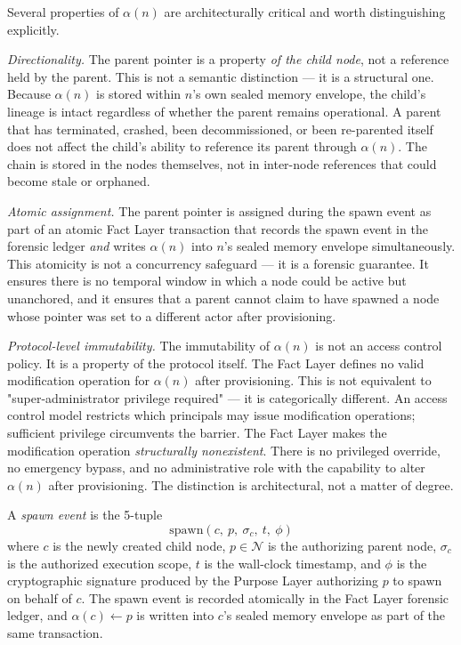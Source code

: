 Several properties of $\alpha(n)$ are architecturally critical and worth distinguishing explicitly.

\textit{Directionality.} The parent pointer is a property \emph{of the child node}, not a reference held by the parent. This is not a semantic distinction — it is a structural one. Because $\alpha(n)$ is stored within $n$'s own sealed memory envelope, the child's lineage is intact regardless of whether the parent remains operational. A parent that has terminated, crashed, been decommissioned, or been re-parented itself does not affect the child's ability to reference its parent through $\alpha(n)$. The chain is stored in the nodes themselves, not in inter-node references that could become stale or orphaned.

\textit{Atomic assignment.} The parent pointer is assigned during the spawn event as part of an atomic Fact Layer transaction that records the spawn event in the forensic ledger \emph{and} writes $\alpha(n)$ into $n$'s sealed memory envelope simultaneously. This atomicity is not a concurrency safeguard — it is a forensic guarantee. It ensures there is no temporal window in which a node could be active but unanchored, and it ensures that a parent cannot claim to have spawned a node whose pointer was set to a different actor after provisioning.

\textit{Protocol-level immutability.} The immutability of $\alpha(n)$ is not an access control policy. It is a property of the protocol itself. The Fact Layer defines no valid modification operation for $\alpha(n)$ after provisioning. This is not equivalent to "super-administrator privilege required" — it is categorically different. An access control model restricts which principals may issue modification operations; sufficient privilege circumvents the barrier. The Fact Layer makes the modification operation \emph{structurally nonexistent}. There is no privileged override, no emergency bypass, and no administrative role with the capability to alter $\alpha(n)$ after provisioning. The distinction is architectural, not a matter of degree.

\begin{dfn}
\label{dfn:spawn-event}
A \emph{spawn event} is the 5-tuple
\begin{equation}
\mathrm{spawn}(c,\ p,\ \sigma_c,\ t,\ \phi)
\label{eq:spawn-event}
\end{equation}
where $c$ is the newly created child node, $p \in \mathcal{N}$ is the authorizing parent node, $\sigma_c$ is the authorized execution scope, $t$ is the wall-clock timestamp, and $\phi$ is the cryptographic signature produced by the Purpose Layer authorizing $p$ to spawn on behalf of $c$. The spawn event is recorded atomically in the Fact Layer forensic ledger, and $\alpha(c) \leftarrow p$ is written into $c$'s sealed memory envelope as part of the same transaction.
\end{dfn}

